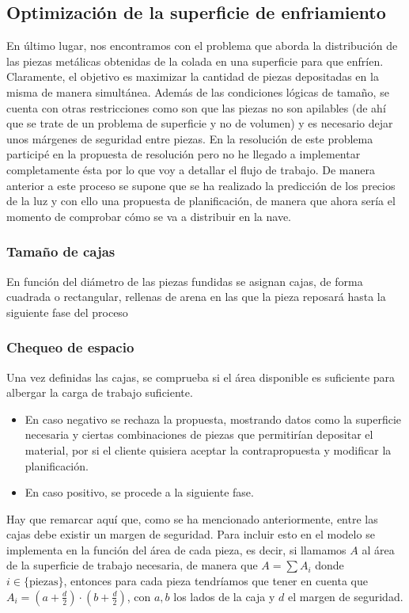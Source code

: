 \subsection{Optimización de la superficie de enfriamiento}
%
%
En último lugar, nos encontramos con el problema que aborda la distribución de las piezas metálicas obtenidas de la colada en una superficie para que enfríen. Claramente, el objetivo es maximizar la cantidad de piezas depositadas en la misma de manera simultánea. Además de las condiciones lógicas de tamaño, se cuenta con otras restricciones como son que las piezas no son apilables (de ahí que se trate de un problema de superficie y no de volumen) y es necesario dejar unos márgenes de seguridad entre piezas. En la resolución de este problema participé en la propuesta de resolución pero no he llegado a implementar completamente ésta por lo que voy a detallar el flujo de trabajo. De manera anterior a este proceso se supone que se ha realizado la predicción de los precios de la luz y con ello una propuesta de planificación, de manera que ahora sería el momento de comprobar cómo se va a distribuir en la nave.
\subsubsection{Tamaño de cajas}
     En función del diámetro de las piezas fundidas se asignan cajas, de forma cuadrada o rectangular, rellenas de arena en las que la pieza reposará hasta la siguiente fase del proceso
\subsubsection{Chequeo de espacio} Una vez definidas las cajas, se comprueba si el área disponible es suficiente para albergar la carga de trabajo suficiente.
\begin{itemize}
    \item En caso negativo se rechaza la propuesta, mostrando datos como la superficie necesaria y ciertas combinaciones de piezas que permitirían depositar el material, por si el cliente quisiera aceptar la contrapropuesta y modificar la planificación.
    \item En caso positivo, se procede a la siguiente fase.
   \end{itemize}
Hay que remarcar aquí que, como se ha mencionado anteriormente, entre las cajas debe existir un margen de seguridad. Para incluir esto en el modelo se implementa en la función del área de cada pieza, es decir, si llamamos $A$ al área de la superficie de trabajo necesaria, de manera que $A = \sum A_i$ donde $i \in \{\text{piezas}\}$, entonces para cada pieza tendríamos que tener en cuenta que $A_i = (a+\frac{d}{2})\cdot(b+\frac{d}{2})$, con $a,b$ los lados de la caja y $d$ el margen de seguridad.
